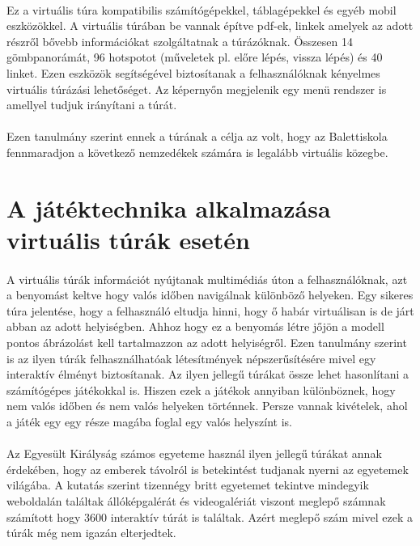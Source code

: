 \paragraph{}
Ez a virtuális túra kompatibilis számítógépekkel, táblagépekkel és egyéb mobil eszközökkel. A virtuális túrában be vannak építve pdf-ek, linkek amelyek az adott részről bővebb információkat szolgáltatnak a túrázóknak. Összesen 14 gömbpanorámát, 96 hotspotot (műveletek pl. előre lépés, vissza lépés) és 40 linket. Ezen eszközök segítségével biztosítanak a felhasználóknak kényelmes virtuális túrázási lehetőséget. Az képernyőn megjelenik egy menü rendszer is amellyel tudjuk irányítani a túrát.
\paragraph{}
Ezen tanulmány szerint ennek a túrának a célja az volt, hogy az Balettiskola fennmaradjon a következő nemzedékek számára is legalább virtuális közegbe. \cite{napolitano2017virtual}

\section{A játéktechnika alkalmazása virtuális túrák esetén}
\paragraph{}
A virtuális túrák információt nyújtanak multimédiás úton a felhasználóknak, azt a benyomást keltve hogy valós időben navigálnak különböző helyeken. Egy sikeres túra jelentése, hogy a felhasználó eltudja hinni, hogy ő habár virtuálisan is de járt abban az adott helyiségben. Ahhoz hogy ez a benyomás létre jőjön a modell pontos ábrázolást kell tartalmazzon az adott helyiségről. Ezen tanulmány szerint is az ilyen túrák felhasználhatóak létesítmények népszerűsítésére mivel egy interaktív élményt biztosítanak. Az ilyen jellegű túrákat össze lehet hasonlítani a számítógépes játékokkal is. Hiszen ezek a játékok annyiban különböznek, hogy nem valós időben és nem valós helyeken történnek. Persze vannak kivételek, ahol a játék egy egy része magába foglal egy valós helyszínt is. 
\paragraph{}
Az Egyesült Királyság számos egyeteme használ ilyen jellegű túrákat annak érdekében, hogy az emberek távolról is betekintést tudjanak nyerni az egyetemek világába. A kutatás szerint tizennégy britt egyetemet tekintve mindegyik weboldalán találtak állóképgalérát és videogalériát viszont meglepő számnak számított hogy 3600 interaktív túrát is találtak. Azért meglepő szám mivel ezek a túrák még nem igazán elterjedtek.
